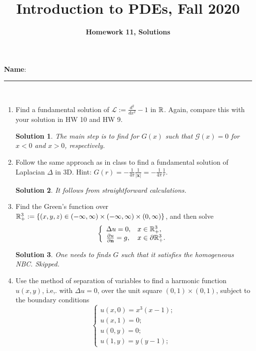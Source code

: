 \documentclass[6pt]{article}
\title{Introduction to PDEs, Fall 2020}
\author{\textbf{Homework 11, Solutions}}
\date{}
\newtheorem{solution}{Solution}
\numberwithin{equation}{section}
\def\mathbb{\Bbb}
\begin{document}
\maketitle

\textbf{Name}:\rule{1 in}{0.001 in} \\

\begin{enumerate}
\item Find a fundamental solution of $\mathcal L:=\frac{d^2}{dx^2}-1$ in $\mathbb R$.  Again, compare this with your solution in HW 10 and HW 9.
\begin{solution}
The main step is to find for $G(x)$ such that $\mathcal G(x)=0$ for $x<0$ and $x>0$, respectively.  
\end{solution}

\item Follow the same approach as in class to find a fundamental solution of Laplacian $\Delta$ in 3D.  Hint: $G(r)=-\frac{1}{4\pi}\frac{1}{|\textbf{x}|}=-\frac{1}{4\pi}\frac{1}{r}$.
\begin{solution}
It follows from straightforward calculations.  
\end{solution}

\item Find the Green's function over $\mathbb R^3_+:=\{(x,y,z)\in (-\infty,\infty)\times(-\infty,\infty)\times (0,\infty) \}$, and then solve
\begin{equation}
\left\{
\begin{array}{ll}
\Delta u=0,& x\in \mathbb R^3_+,\\
\frac{\partial u}{\partial \textbf{n}}=g,& x\in \partial \mathbb R^3_+.
\end{array}
\right.
\end{equation}
\begin{solution}
One needs to finds $G$ such that it satisfies the homogeneous NBC.  Skipped.
\end{solution}


\item Use the method of separation of variables to find a harmonic function $u(x,y)$, i.e,. with $\Delta u=0$, over the unit square $(0,1)\times (0,1)$, subject to the boundary conditions
\begin{equation}
\left\{
\begin{array}{ll}
u(x,0)=x^3(x-1);\\
u(x,1)=0;\\
u(0,y)=0;\\
u(1,y)=y(y-1);
\end{array}
\right.
\end{equation}


\end{enumerate}
\end{document}

